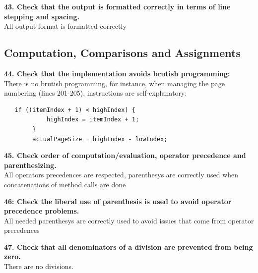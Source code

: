 \documentclass{article}
\begin{document}
\begin{flushleft}
\textbf{43. Check that the output is formatted correctly in terms of line stepping and spacing.}\\
\vspace{0.5cm}
All output format is formatted correctly\\
\vspace{0.5cm}






\subsection{Computation, Comparisons and Assignments}
\textbf{44. Check that the implementation avoids brutish programming:}\\
\vspace{0.5cm}
There is no brutish programming, for instance, when managing the page numbering (lines 201-205), instructions are self-explanatory: \\
\vspace{0.5cm}
\begin{lstlisting}
   if ((itemIndex + 1) < highIndex) {
            highIndex = itemIndex + 1;
        }
        actualPageSize = highIndex - lowIndex;
   \end{lstlisting}     
     \vspace{0.5cm}   
 \newpage
       
\textbf{45. Check order of computation/evaluation, operator precedence and parenthesizing.}  \\
\vspace{0.5cm}
All operators precedences are respected, parenthesys are correctly used when concatenations of method calls are done \\
\vspace{0.5cm}
   
   
   
\textbf{46: Check the liberal use of parenthesis is used to avoid operator precedence problems.}    \\
\vspace{0.5cm}
All needed parenthesys are correctly used to avoid issues that come from operator precedences\\
\vspace{0.5cm}


\textbf{47. Check that all denominators of a division are prevented from being zero.} \\
\vspace{0.5cm}
There are no divisions.\\
\vspace{0.5cm}



\end{flushleft}
\end{document}
